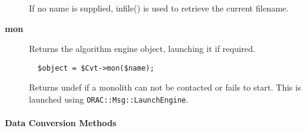 \begin{description}
If no name is supplied, infile() is used to retrieve the current
filename.


\item[{\textbf{mon}}] \mbox{}

Returns the algorithm engine object, launching it if required.

\begin{verbatim}
  $object = $Cvt->mon($name);
\end{verbatim}


Returns undef if a monolith can not be contacted or fails to start.
This is launched using \texttt{ORAC::Msg::LaunchEngine}.

\end{description}
\paragraph*{Data Conversion Methods\label{ORAC::Convert_Data_Conversion_Methods}}

